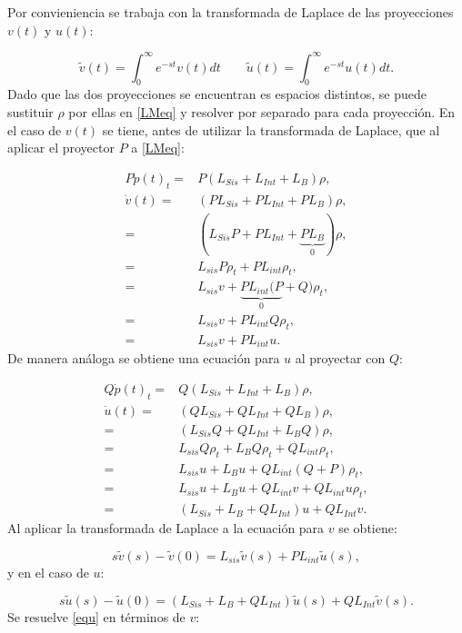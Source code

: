 \documentclass[a4paper,10pt]{report}
\begin{document}
Por convieniencia se trabaja con la transformada de Laplace \cite{ArfkenMM} de las proyecciones $v(t)$ y $u(t)$:

\begin{equation}
\tilde{v}(t) = \int_0^\infty e^{-st}v(t)dt \qquad \tilde{u}(t) = \int_0^\infty e^{-st}u(t)dt.
\end{equation} Dado que las dos proyecciones se encuentran es espacios distintos, se puede sustituir $\rho$ por ellas en \eqref{LMeq} y resolver por separado para cada proyección. En el caso de $v(t)$ se tiene, antes de utilizar la transformada de Laplace, que al aplicar el proyector $P$ a \eqref{LMeq}:

\begin{align*}
P\dot{p}(t)_t =& P(L_{Sis}+L_{Int}+L_B)\rho, \\
 \dot{v}(t) =& (PL_{Sis}+PL_{Int}+PL_B)\rho, \\
 =&(L_{Sis}P+PL_{Int}+\underbrace{PL_B}_0)\rho, \\
 =& L_{sis}P\rho_t + PL_{int}\rho_t, \\
 =& L_{sis}v + \underbrace{PL_{int}(P}_0+Q)\rho_t, \\
 =& L_{sis}v + PL_{int}Q\rho_t, \\
 =& L_{sis}v + PL_{int}u.
\end{align*} De manera análoga se obtiene una ecuación para $u$ al proyectar con $Q$:

\begin{align*}
Q\dot{p}(t)_t =& Q(L_{Sis}+L_{Int}+L_B)\rho, \\
 \dot{u}(t) =& (QL_{Sis}+QL_{Int}+QL_B)\rho, \\
 =&(L_{Sis}Q+QL_{Int}+L_BQ)\rho, \\
 =& L_{sis}Q\rho_t + L_{B}Q\rho_t + QL_{int}\rho_t, \\
 =& L_{sis}u + L_{B}u + QL_{int}(Q+P)\rho_t,  \\
 =& L_{sis}u + L_{B}u + QL_{int}v+QL_{int}u\rho_t, \\
 =& (L_{Sis}+L_B+QL_{Int})u +QL_{Int}v. 
\end{align*} Al aplicar la transformada de Laplace a la ecuación para $v$ se obtiene:

\begin{equation}\label{eqv}
s\tilde{v}(s)-\tilde{v}(0) = L_{sis}\tilde{v}(s) + PL_{int}\tilde{u}(s),
\end{equation} y en el caso de $u$:

\begin{equation}\label{equ}
s\tilde{u}(s)-\tilde{u}(0) = (L_{Sis}+L_B+QL_{Int})\tilde{u}(s) + QL_{Int}\tilde{v}(s).
\end{equation} Se resuelve \eqref{equ} en términos de $v$:
\end{document}
